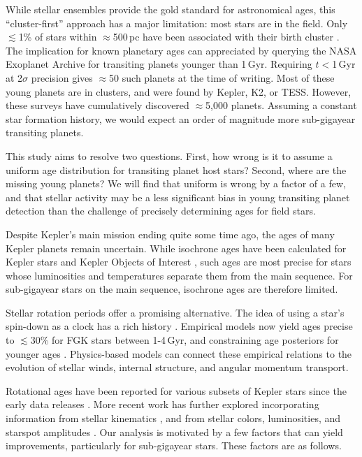 \documentclass[11pt,twocolumn,tighten]{aastex63}
\begin{document}
While stellar ensembles provide the gold standard for astronomical ages,
this ``cluster-first'' approach has a major limitation: most 
stars are in the field.  Only $\lesssim$1\% of stars within
$\approx$500\,pc have been associated with their birth cluster
\citep[e.g.][]{Zari_2018,CantatGaudin_2020,Kounkel_2020,Kerr_2021}.
The implication for known planetary ages can appreciated by querying the NASA Exoplanet Archive
\citep[NEA;][]{2013PASP..125..989A} for transiting planets younger
than 1\,Gyr.  Requiring $t$$<$1\,Gyr at 2$\sigma$ precision gives
$\approx$50 such planets at the time of writing.  Most of these young
planets are in clusters, and were found by Kepler, K2, or TESS.
However, these surveys have cumulatively discovered $\approx$5{,}000 planets.
Assuming a constant star formation history, we would expect an
order of magnitude more sub-gigayear transiting planets.

This study aims to resolve two questions.  First, how wrong is it to
assume a uniform age distribution for transiting planet host stars?
Second, where are the missing young planets?  We will find that
uniform is wrong by a factor of a few, and that stellar activity may
be a less significant bias in young transiting planet detection than
the challenge of precisely determining ages for field stars.

Despite Kepler's main mission ending quite some time ago, the ages of
many Kepler planets remain uncertain.  While isochrone ages have been
calculated for Kepler stars \citep{Berger_2020b_rpage} and Kepler
Objects of Interest \citep[KOIs;][]{Petigura_2022}, such ages are most
precise for stars whose luminosities and temperatures separate them
from the main sequence.  For sub-gigayear stars on the main sequence,
isochrone ages are therefore limited.

Stellar rotation periods offer a promising alternative.  The idea of
using a star's spin-down as a clock has a rich history
\citep{Skumanich_1972,Noyes_1984,Kawaler_1989,Barnes03,Mamajek_2008,Angus_2015,2023ApJ...954L..50E}.
Empirical models now yield ages precise to $\lesssim$30\% for FGK
stars between 1-4\,Gyr, and constraining age posteriors for younger
ages \citep{Bouma_2023}.  Physics-based models
\citep{Matt_2015,Gallet_Bouvier_2015,Spada_2020} can connect these
empirical relations to the evolution of stellar winds, internal
structure, and angular momentum transport.

Rotational ages have been reported for various subsets of Kepler
stars since the early data releases
\citep[e.g.][]{Walkowicz_2013,McQuillan_2014,Reinhold_2015,Angus_2018}.
More recent work has further explored incorporating information from
stellar kinematics \citep{2021AJ....161..189L,2024AJ....167..159L},
and from stellar colors, luminosities, and starspot amplitudes
\citep{2023ApJ...952..131M}.  Our analysis is motivated by a few
factors that can yield improvements, particularly for sub-gigayear
stars.   These factors are as follows.
\end{document}
